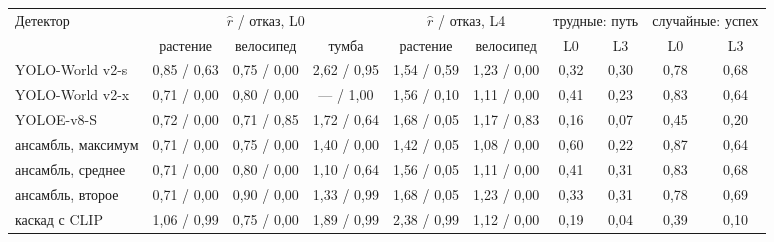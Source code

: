 \begin{tabular}{l|ccc|cc|cc|cc}
\toprule
Детектор & \multicolumn{3}{c|}{$\hat r$ / отказ, L0} & \multicolumn{2}{c|}{$\hat r$ / отказ, L4} & \multicolumn{2}{c|}{трудные: путь} & \multicolumn{2}{c}{случайные: успех} \\
 & растение & велосипед & тумба & растение & велосипед & L0 & L3 & L0 & L3 \\
\midrule
YOLO-World v2-s & 0{,}85 / 0{,}63 & 0{,}75 / 0{,}00 & 2{,}62 / 0{,}95 & 1{,}54 / 0{,}59 & 1{,}23 / 0{,}00 & 0{,}32 & 0{,}30 & 0{,}78 & 0{,}68 \\
YOLO-World v2-x & 0{,}71 / 0{,}00 & 0{,}80 / 0{,}00 & --- / 1{,}00 & 1{,}56 / 0{,}10 & 1{,}11 / 0{,}00 & 0{,}41 & 0{,}23 & 0{,}83 & 0{,}64 \\
YOLOE-v8-S & 0{,}72 / 0{,}00 & 0{,}71 / 0{,}85 & 1{,}72 / 0{,}64 & 1{,}68 / 0{,}05 & 1{,}17 / 0{,}83 & 0{,}16 & 0{,}07 & 0{,}45 & 0{,}20 \\
ансамбль, максимум & 0{,}71 / 0{,}00 & 0{,}75 / 0{,}00 & 1{,}40 / 0{,}00 & 1{,}42 / 0{,}05 & 1{,}08 / 0{,}00 & 0{,}60 & 0{,}22 & 0{,}87 & 0{,}64 \\
ансамбль, среднее & 0{,}71 / 0{,}00 & 0{,}80 / 0{,}00 & 1{,}10 / 0{,}64 & 1{,}56 / 0{,}05 & 1{,}11 / 0{,}00 & 0{,}41 & 0{,}31 & 0{,}83 & 0{,}68 \\
ансамбль, второе & 0{,}71 / 0{,}00 & 0{,}90 / 0{,}00 & 1{,}33 / 0{,}99 & 1{,}68 / 0{,}05 & 1{,}23 / 0{,}00 & 0{,}33 & 0{,}31 & 0{,}78 & 0{,}69 \\
каскад с CLIP & 1{,}06 / 0{,}99 & 0{,}75 / 0{,}00 & 1{,}89 / 0{,}99 & 2{,}38 / 0{,}99 & 1{,}12 / 0{,}00 & 0{,}19 & 0{,}04 & 0{,}39 & 0{,}10 \\
\bottomrule
\end{tabular}
